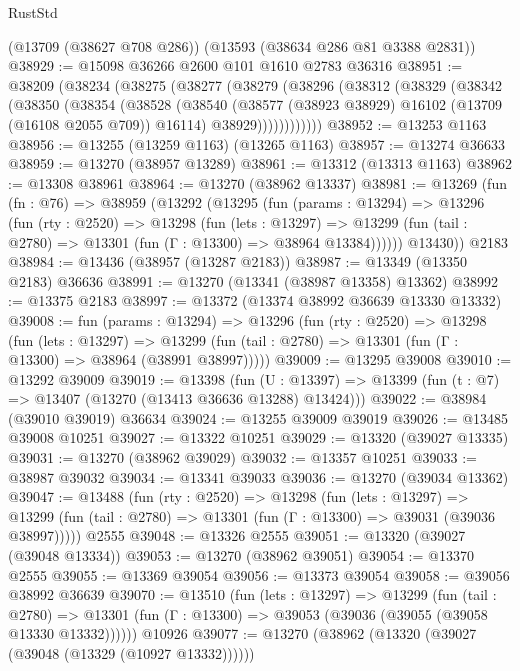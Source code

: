 \begin{lexlean}{RustStd}
\begin{coremodule}
    (@13709 (@38627 @708 @286))
    (@13593 (@38634 @286 @81 @3388 @2831))
@38929 := @15098 @36266 @2600 @101 @1610 @2783 @36316
@38951 := @38209
    (@38234
      (@38275
        (@38277
          (@38279
            (@38296
              (@38312
                (@38329
                  (@38342
                    (@38350
                      (@38354
                        (@38528
                          (@38540
                            (@38577 (@38923 @38929) @16102 (@13709 (@16108 @2055 @709)) @16114)
                            @38929))))))))))))
@38952 := @13253 @1163
@38956 := @13255 (@13259 @1163) (@13265 @1163)
@38957 := @13274 @36633
@38959 := @13270 (@38957 @13289)
@38961 := @13312 (@13313 @1163)
@38962 := @13308 @38961
@38964 := @13270 (@38962 @13337)
@38981 := @13269
    (fun (fn : @76) =>
    @38959
      (@13292
        (@13295
          (fun (params : @13294) =>
          @13296
            (fun (rty : @2520) =>
            @13298
              (fun (lets : @13297) =>
              @13299 (fun (tail : @2780) => @13301 (fun (Γ : @13300) => @38964 @13384))))))
        @13430))
    @2183
@38984 := @13436 (@38957 (@13287 @2183))
@38987 := @13349 (@13350 @2183) @36636
@38991 := @13270 (@13341 (@38987 @13358) @13362)
@38992 := @13375 @2183
@38997 := @13372 (@13374 @38992 @36639 @13330 @13332)
@39008 := fun (params : @13294) =>
  @13296
    (fun (rty : @2520) =>
    @13298
      (fun (lets : @13297) =>
      @13299 (fun (tail : @2780) => @13301 (fun (Γ : @13300) => @38964 (@38991 @38997)))))
@39009 := @13295 @39008
@39010 := @13292 @39009
@39019 := @13398
    (fun (U : @13397) => @13399 (fun (t : @7) => @13407 (@13270 (@13413 @36636 @13288) @13424)))
@39022 := @38984 (@39010 @39019) @36634
@39024 := @13255 @39009 @39019
@39026 := @13485 @39008 @10251
@39027 := @13322 @10251
@39029 := @13320 (@39027 @13335)
@39031 := @13270 (@38962 @39029)
@39032 := @13357 @10251
@39033 := @38987 @39032
@39034 := @13341 @39033
@39036 := @13270 (@39034 @13362)
@39047 := @13488
    (fun (rty : @2520) =>
    @13298
      (fun (lets : @13297) =>
      @13299 (fun (tail : @2780) => @13301 (fun (Γ : @13300) => @39031 (@39036 @38997)))))
    @2555
@39048 := @13326 @2555
@39051 := @13320 (@39027 (@39048 @13334))
@39053 := @13270 (@38962 @39051)
@39054 := @13370 @2555
@39055 := @13369 @39054
@39056 := @13373 @39054
@39058 := @39056 @38992 @36639
@39070 := @13510
    (fun (lets : @13297) =>
    @13299
      (fun (tail : @2780) =>
      @13301 (fun (Γ : @13300) => @39053 (@39036 (@39055 (@39058 @13330 @13332))))))
    @10926
@39077 := @13270 (@38962 (@13320 (@39027 (@39048 (@13329 (@10927 @13332))))))

\end{coremodule}
\end{lexlean}
